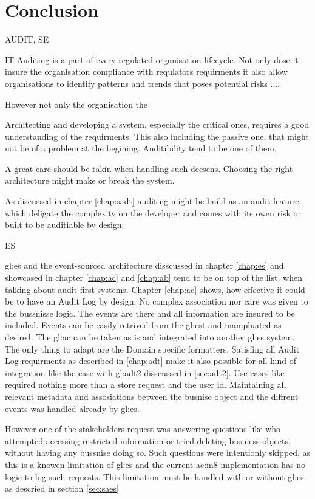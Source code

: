 %
\chapter{Conclusion}

AUDIT, SE

IT-Auditing is a part of every regulated organisation lifecycle. Not only dose it insure the organisation compliance with requlators requirments it also allow organisations to identify patterns and trends that poses potential risks ....

However not only the organisation the 

Architecting and developing a system, especially the critical ones, requires a good understanding of the requirments. This also including the passive one, that might not be of a problem at the begining. Auditibility tend to be one of them. 

A great care should be takin when handling such decsens. Choosing the right architecture might make or break the system.

As discussed in chapter \ref{chap:sadt} auditing might be build as an audit feature, which deligate the complexity on the developer and comes with its owen risk or built to be auditiable by design.

ES

\gls{gl:es} and the event-sourced architecture disscussed in chapter \ref{chap:es} and showcased in chapter \ref{chap:ac} and \ref{chap:ab} tend to be on top of the list, when talking about audit first systems. Chapter \ref{chap:ac} shows, how effective it could be to have an Audit Log by design. No complex association nor care was given to the bussnisse logic. The events are there and all information are insured to be included. Events can be easily retrived from the \gls{gl:est} and manipluated as desired. The \gls{gl:ac} can be taken as is and integrated into another \gls{gl:es} system. The only thing to adapt are the Domain specific formatters. Satisfing all Audit Log requirments as described in \ref{chap:adt} make it also possible for all kind of integration like the case with \gls{gl:adt2} disscussed in \ref{sec:adt2}. Use-cases like  required nothing more than a store request and the user id. Maintaining all relevant metadata and assosiations between the busnise object and the diffrent events was handled already by \gls{gl:es}.

However one of the stakeholders request was answering questions like who attempted accessing restricted information or tried deleting business objects, without having any bussnise doing so. Such questions were intentionly skipped, as this is a knowen limitation of \gls{gl:es} and the current \gls{ac:m8} implementation has no logic to log such requests. This limitation must be handled with or without \gls{gl:es} as descried in section \ref{sec:saes}

